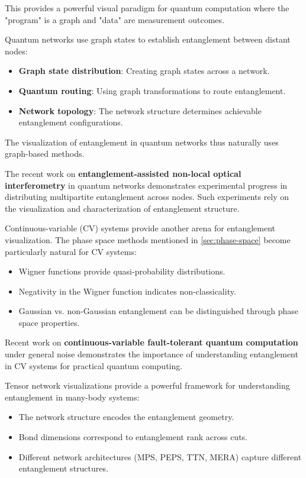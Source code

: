 \documentclass[%
 amsmath,amssymb,
 aps,
rmp,
]{revtex4-2}
\begin{document}
This provides a powerful visual paradigm for quantum computation where the "program" is a graph and "data" are measurement outcomes.

Quantum networks use graph states to establish entanglement between distant nodes:
\begin{itemize}
	\item \textbf{Graph state distribution}: Creating graph states across a network.
	\item \textbf{Quantum routing}: Using graph transformations to route entanglement.
	\item \textbf{Network topology}: The network structure determines achievable entanglement configurations.
\end{itemize}

The visualization of entanglement in quantum networks thus naturally uses graph-based methods.

The recent work on \textbf{entanglement-assisted non-local optical interferometry} in quantum networks demonstrates experimental progress in distributing multipartite entanglement across nodes. Such experiments rely on the visualization and characterization of entanglement structure.

Continuous-variable (CV) systems provide another arena for entanglement visualization. The phase space methods mentioned in \cref{sec:phase-space} become particularly natural for CV systems:
\begin{itemize}
	\item Wigner functions provide quasi-probability distributions.
	\item Negativity in the Wigner function indicates non-classicality.
	\item Gaussian vs. non-Gaussian entanglement can be distinguished through phase space properties.
\end{itemize}

Recent work on \textbf{continuous-variable fault-tolerant quantum computation} under general noise demonstrates the importance of understanding entanglement in CV systems for practical quantum computing.

Tensor network visualizations provide a powerful framework for understanding entanglement in many-body systems:
\begin{itemize}
	\item The network structure encodes the entanglement geometry.
	\item Bond dimensions correspond to entanglement rank across cuts.
	\item Different network architectures (MPS, PEPS, TTN, MERA) capture different entanglement structures.
\end{itemize}
\end{document}
